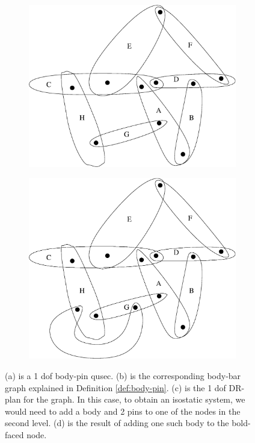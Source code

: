 \begin{figure}\centering
\begin{subfigure}{0.2\linewidth}\centering
    \includegraphics[width=\linewidth]{img/bodypin}
    \caption{}
\end{subfigure}
%
\begin{subfigure}{0.2\linewidth}\centering
    
    \caption{}
\end{subfigure}
%
\begin{subfigure}{0.3\linewidth}\centering\scriptsize
    
    \caption{}
\end{subfigure}
%
\begin{subfigure}{0.2\linewidth}\centering
    \includegraphics[width=\linewidth]{img/bodypin2}
    \caption{}
\end{subfigure}
%
\caption{(a) is a 1 dof body-pin qusec. (b) is the corresponding body-bar graph explained in Definition \ref{def:body-pin}. (c) is the 1 dof DR-plan for the graph. In this case, to obtain an isostatic system, we would need to add a body and 2 pins to one of the nodes in the second level. (d) is the result of adding one such body to the bold-faced node.}


\end{figure}
